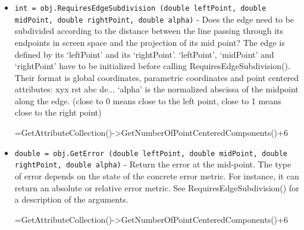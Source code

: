 \begin{itemize}
\item  \verb|int = obj.RequiresEdgeSubdivision (double leftPoint, double midPoint, double rightPoint, double alpha)| -  Does the edge need to be subdivided according to the distance between
 the line passing through its endpoints in screen space and the projection
 of its mid point?
 The edge is defined by its `leftPoint' and its `rightPoint'.
 `leftPoint', `midPoint' and `rightPoint' have to be initialized before
 calling RequiresEdgeSubdivision().
 Their format is global coordinates, parametric coordinates and
 point centered attributes: xyx rst abc de...
 `alpha' is the normalized abscissa of the midpoint along the edge.
 (close to 0 means close to the left point, close to 1 means close to the
 right point)
 
 
 
 
 
          =GetAttributeCollection()->GetNumberOfPointCenteredComponents()+6

\item  \verb|double = obj.GetError (double leftPoint, double midPoint, double rightPoint, double alpha)| -  Return the error at the mid-point. The type of error depends on the state
 of the concrete error metric. For instance, it can return an absolute
 or relative error metric.
 See RequiresEdgeSubdivision() for a description of the arguments.
 
 
 
 
 
          =GetAttributeCollection()->GetNumberOfPointCenteredComponents()+6
 

\end{itemize}
